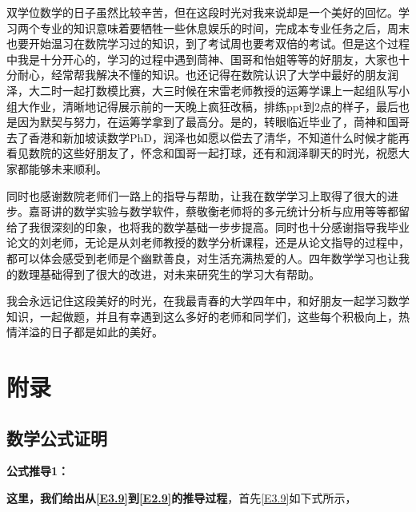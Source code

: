 \documentclass[12pt]{article} %
\begin{document}
	双学位数学的日子虽然比较辛苦，但在这段时光对我来说却是一个美好的回忆。学习两个专业的知识意味着要牺牲一些休息娱乐的时间，完成本专业任务之后，周末也要开始温习在数院学习过的知识，到了考试周也要考双倍的考试。但是这个过程中我是十分开心的，学习的过程中遇到茼神、国哥和怡姐等等的好朋友，大家也十分耐心，经常帮我解决不懂的知识。也还记得在数院认识了大学中最好的朋友润泽，大二时一起打数模比赛，大三时候在宋雷老师教授的运筹学课上一起组队写小组大作业，清晰地记得展示前的一天晚上疯狂改稿，排练ppt到2点的样子，最后也是因为默契与努力，在运筹学拿到了最高分。是的，转眼临近毕业了，茼神和国哥去了香港和新加坡读数学PhD，润泽也如愿以偿去了清华，不知道什么时候才能再看见数院的这些好朋友了，怀念和国哥一起打球，还有和润泽聊天的时光，祝愿大家都能够未来顺利。
	
	同时也感谢数院老师们一路上的指导与帮助，让我在数学学习上取得了很大的进步。嘉哥讲的数学实验与数学软件，蔡敬衡老师将的多元统计分析与应用等等都留给了我很深刻的印象，也将我的数学基础一步步提高。同时也十分感谢指导我毕业论文的刘老师，无论是从刘老师教授的数学分析课程，还是从论文指导的过程中，都可以体会感受到老师是个幽默善良，对生活充满热爱的人。四年数学学习也让我的数理基础得到了很大的改进，对未来研究生的学习大有帮助。
	
	我会永远记住这段美好的时光，在我最青春的大学四年中，和好朋友一起学习数学知识，一起做题，并且有幸遇到这么多好的老师和同学们，这些每个积极向上，热情洋溢的日子都是如此的美好。
	
	\newpage
	
	
	
	\newpage
	\section{附录}
	
	\subsection{数学公式证明}
	\noindent
	\textbf{公式推导1：}
	
	\textbf{这里，我们给出从\eqref{E3.9}到\eqref{E2.9}的推导过程}，首先\eqref{E3.9}如下式所示，
	
\end{document}
